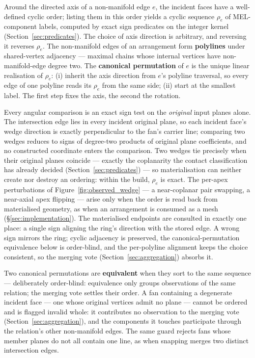 \documentclass{egpubl}
\begin{document}
Around the directed axis of a non-manifold edge $e$, the incident faces have a well-defined cyclic order; listing them in this order yields a cyclic sequence $\rho_e$ of MEL-component labels, computed by exact sign predicates on the integer kernel (Section~\ref{sec:predicates}). The choice of axis direction is arbitrary, and reversing it reverses $\rho_e$. The non-manifold edges of an arrangement form \textbf{polylines} under shared-vertex adjacency --- maximal chains whose internal vertices have non-manifold-edge degree two. The \textbf{canonical permutation} of $e$ is the unique linear realisation of $\rho_e$: (i) inherit the axis direction from $e$'s polyline traversal, so every edge of one polyline reads its $\rho_e$ from the same side; (ii) start at the smallest label. The first step fixes the axis, the second the rotation.

Every angular comparison is an exact sign test on the \emph{original} input planes alone. The intersection edge lies in every incident original plane, so each incident face's wedge direction is exactly perpendicular to the fan's carrier line; comparing two wedges reduces to signs of degree-two products of original plane coefficients, and no constructed coordinate enters the comparison. Two wedges tie precisely when their original planes coincide --- exactly the coplanarity the contact classification has already decided (Section~\ref{sec:predicates}) --- so materialisation can neither create nor destroy an ordering: within the build, $\rho_e$ is exact. The per-apex perturbations of Figure~\ref{fig:observed_wedge} --- a near-coplanar pair swapping, a near-axial apex flipping --- arise only when the order is read back from materialised geometry, as when an arrangement is consumed as a mesh (\S\ref{sec:implementation}). The materialised endpoints are consulted in exactly one place: a single sign aligning the ring's direction with the stored edge. A wrong sign mirrors the ring; cyclic adjacency is preserved, the canonical-permutation equivalence below is order-blind, and the per-polyline alignment keeps the choice consistent, so the merging vote (Section~\ref{sec:aggregation}) absorbs it.

Two canonical permutations are \textbf{equivalent} when they sort to the same sequence --- deliberately order-blind: equivalence only groups observations of the same relation; the merging vote settles their order. A fan containing a degenerate incident face --- one whose original vertices admit no plane --- cannot be ordered and is flagged invalid whole: it contributes no observation to the merging vote (Section~\ref{sec:aggregation}), and the components it touches participate through the relation's other non-manifold edges. The same guard rejects fans whose member planes do not all contain one line, as when snapping merges two distinct intersection edges.
\end{document}
